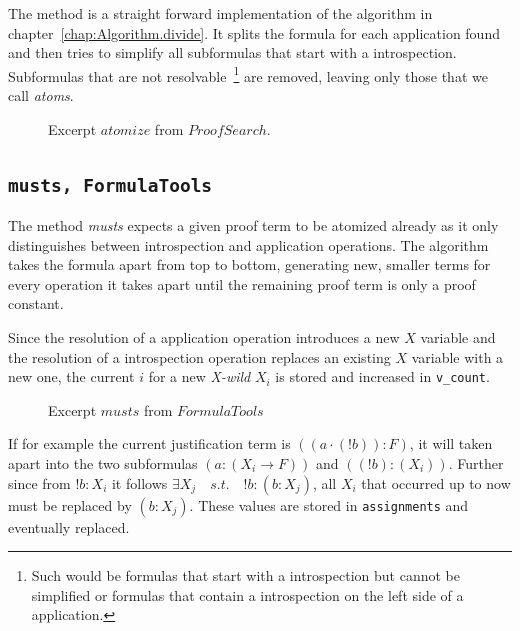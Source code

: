 The method is a straight forward implementation of the algorithm in chapter~\ref{chap:Algorithm.divide}. It splits the formula for each application found and then tries to simplify all subformulas that start with a introspection. Subformulas that are not resolvable~\footnote{Such would be formulas that start with a introspection but cannot be simplified or formulas that contain a introspection on the left side of a application.} are removed, leaving only those that we call \emph{atoms}.

\begin{figure}[H]
	\caption{Excerpt $atomize$ from $ProofSearch$.}
    \vspace{-10pt}
	
	\vspace{-10pt}
\end{figure}

\subsection[musts]{\texttt{musts, FormulaTools}}
The method \emph{musts} expects a given proof term to be atomized already as it only distinguishes between introspection and application operations.
The algorithm takes the formula apart from top to bottom, generating new, smaller terms for every operation it takes apart until the remaining proof term is only a proof constant. 

Since the resolution of a application operation introduces a new $X$ variable and the resolution of a introspection operation replaces an existing $X$ variable with a new one, the current $i$ for a new \emph{X-wild} $X_i$ is stored and increased in \texttt{v\_count}.

\begin{figure}[H]
	\caption{Excerpt $musts$ from $FormulaTools$}
    \vspace{-10pt}
	
	\vspace{-10pt}
\end{figure}

If for example the current justification term is $((a\cdot (!b)):F)$, it will taken apart into the two subformulas $(a:(X_i\rightarrow F))$ and $((!b):(X_i))$. Further since from $!b:X_i$ it follows $\exists X_j \quad s.t. \quad !b:(b:X_j)$, all $X_i$ that occurred up to now must be replaced by $(b:X_j)$. These values are stored in \texttt{assignments} and eventually replaced.

